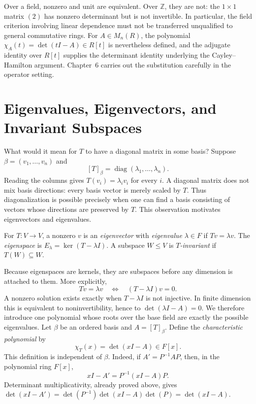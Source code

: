 Over a field, nonzero and unit are equivalent. Over \(\mathbb Z\), they are
not: the \(1\times1\) matrix \((2)\) has nonzero determinant but is not
invertible. In particular, the field criterion involving linear dependence
must not be transferred unqualified to general commutative rings. For
\(A\in M_n(R)\), the polynomial
\(\chi_A(t)=\det(tI-A)\in R[t]\) is nevertheless defined, and the adjugate
identity over \(R[t]\) supplies the determinant identity underlying the
Cayley--Hamilton argument. Chapter~6 carries out the substitution carefully
in the operator setting.

\section{Eigenvalues, Eigenvectors, and Invariant Subspaces}
What would it mean for \(T\) to have a diagonal matrix in some basis? Suppose
\(\beta=(v_1,\ldots,v_n)\) and
\[
[T]_\beta=\operatorname{diag}(\lambda_1,\ldots,\lambda_n).
\]
Reading the columns gives \(T(v_i)=\lambda_i v_i\) for every \(i\). A
diagonal matrix does not mix basis directions: every basis vector is merely
scaled by \(T\). Thus diagonalization is possible precisely when one can find
a basis consisting of vectors whose directions are preserved by \(T\). This
observation motivates eigenvectors and eigenvalues.

\begin{definition}
For \(T:V\to V\), a nonzero \(v\) is an \emph{eigenvector} with
\emph{eigenvalue} \(\lambda\in F\) if \(Tv=\lambda v\). The
\emph{eigenspace} is \(E_\lambda=\ker(T-\lambda I)\). A subspace
\(W\leq V\) is \emph{\(T\)-invariant} if \(T(W)\subseteq W\).
\end{definition}

Because eigenspaces are kernels, they are subspaces before any dimension is
attached to them. More explicitly,
\[
Tv=\lambda v\quad\Longleftrightarrow\quad(T-\lambda I)v=0.
\]
A nonzero solution exists exactly when \(T-\lambda I\) is not injective.
In finite dimension this is equivalent to noninvertibility, hence to
\(\det(\lambda I-A)=0\). We therefore introduce one polynomial whose roots
over the base field are exactly the possible eigenvalues. Let \(\beta\) be
an ordered basis and \(A=[T]_\beta\). Define the \emph{characteristic
polynomial} by
\[\chi_T(x)=\det(xI-A)\in F[x].\]
This definition is independent of \(\beta\). Indeed, if
\(A'=P^{-1}AP\), then, in the polynomial ring \(F[x]\),
\[
xI-A'=P^{-1}(xI-A)P.
\]
Determinant multiplicativity, already proved above, gives
\(\det(xI-A')=\det(P^{-1})\det(xI-A)\det(P)=\det(xI-A)\).

